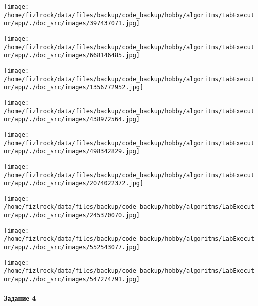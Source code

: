 \documentclass[a4paper, 12pt]{article}
\begin{document}
\texttt{[image: /home/fizlrock/data/files/backup/code\_backup/hobby/algoritms/LabExecutor/app/./doc\_src/images/397437071.jpg]}

\texttt{[image: /home/fizlrock/data/files/backup/code\_backup/hobby/algoritms/LabExecutor/app/./doc\_src/images/668146485.jpg]}

\texttt{[image: /home/fizlrock/data/files/backup/code\_backup/hobby/algoritms/LabExecutor/app/./doc\_src/images/1356772952.jpg]}

\texttt{[image: /home/fizlrock/data/files/backup/code\_backup/hobby/algoritms/LabExecutor/app/./doc\_src/images/438972564.jpg]}

\texttt{[image: /home/fizlrock/data/files/backup/code\_backup/hobby/algoritms/LabExecutor/app/./doc\_src/images/498342829.jpg]}

\texttt{[image: /home/fizlrock/data/files/backup/code\_backup/hobby/algoritms/LabExecutor/app/./doc\_src/images/2074022372.jpg]}

\texttt{[image: /home/fizlrock/data/files/backup/code\_backup/hobby/algoritms/LabExecutor/app/./doc\_src/images/245370070.jpg]}

\texttt{[image: /home/fizlrock/data/files/backup/code\_backup/hobby/algoritms/LabExecutor/app/./doc\_src/images/552543077.jpg]}

\texttt{[image: /home/fizlrock/data/files/backup/code\_backup/hobby/algoritms/LabExecutor/app/./doc\_src/images/547274791.jpg]}
\pagebreak
\paragraph{Задание 4}
\end{document}

